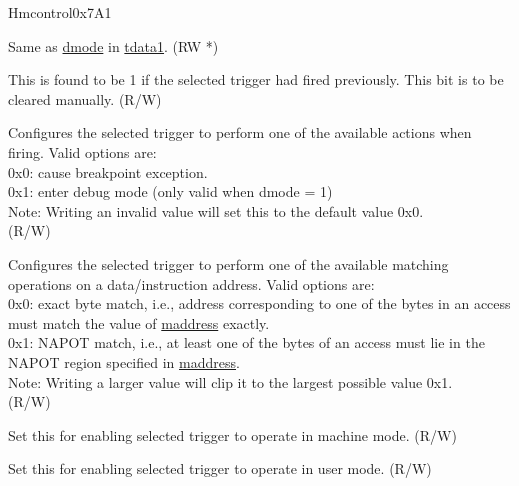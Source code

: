 \begin{register}{H}{mcontrol}{0x7A1}\label{regdesc:MCONTROL}
%
%
%
%
%
%
%
%
%
%
%
%
%
%
\regnewline%
\begin{regdesc}\begin{reglist}
\label{fielddesc:MCONTROLDMODE}\item [dmode] Same as \hyperref[fielddesc:TDATA1DMODE]{dmode} in \hyperref[regdesc:TDATA1]{tdata1}. (RW *)
\label{fielddesc:MCONTROLHIT}\item [hit] This is found to be 1 if the selected trigger had fired previously. This bit is to be cleared manually. (R/W) 
\label{fielddesc:MCONTROLACTION}\item [action] Configures the selected trigger to perform one of the available actions when firing. Valid options are:\\
0x0: cause breakpoint exception.\\
0x1: enter debug mode (only valid when dmode = 1)\\
Note: Writing an invalid value will set this to the default value 0x0.\\
(R/W)
\label{fielddesc:MCONTROLMATCH}\item [match] Configures the selected trigger to perform one of the available matching operations on a data/instruction address. Valid options are:\\
0x0: exact byte match, i.e., address corresponding to one of the bytes in an access must match the value of \hyperref[regdesc:MADDRESS]{maddress} exactly.\\
0x1: NAPOT match, i.e., at least one of the bytes of an access must lie in the NAPOT region specified in \hyperref[regdesc:MADDRESS]{maddress}.\\
Note: Writing a larger value will clip it to the largest possible value 0x1.\\
(R/W)
\label{fielddesc:MCONTROLM}\item [m] Set this for enabling selected trigger to operate in machine mode. (R/W)
\label{fielddesc:MCONTROLU}\item [u] Set this for enabling selected trigger to operate in user mode. (R/W)

\end{reglist}
\end{regdesc}
\end{register}
